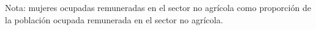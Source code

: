 Nota: mujeres ocupadas remuneradas en el sector no agrícola como proporción de la población ocupada remunerada en el sector no agrícola.